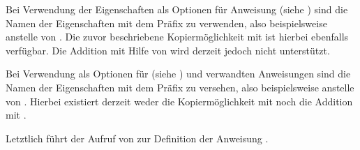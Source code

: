 Bei Verwendung der Eigenschaften als
Optionen für Anweisung
 (siehe
) sind die Namen der Eigenschaften
mit dem Präfix  zu verwenden, also beispielsweise
 anstelle von . Die zuvor beschriebene
Kopiermöglichkeit mit \Option{:=} ist hierbei ebenfalls verfügbar. Die
Addition mit Hilfe von \Option{+=} wird derzeit jedoch nicht unterstützt.

Bei Verwendung als Optionen
für %
%
 (siehe
) und verwandten
Anweisungen sind die Namen der Eigenschaften mit dem Präfix  zu
versehen, also beispielsweise  anstelle von . Hierbei existiert derzeit weder die Kopiermöglichkeit mit
\Option{:=} noch die Addition mit \Option{+=}.

Letztlich führt der Aufruf von  zur Definition der
Anweisung .


